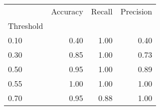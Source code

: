 \begin{tabular}{lrrr}
\toprule
{} &  Accuracy &  Recall &  Precision \\
Threshold &           &         &            \\
\midrule
0.10      &      0.40 &    1.00 &       0.40 \\
0.30      &      0.85 &    1.00 &       0.73 \\
0.50      &      0.95 &    1.00 &       0.89 \\
0.55      &      1.00 &    1.00 &       1.00 \\
0.70      &      0.95 &    0.88 &       1.00 \\
\bottomrule
\end{tabular}
